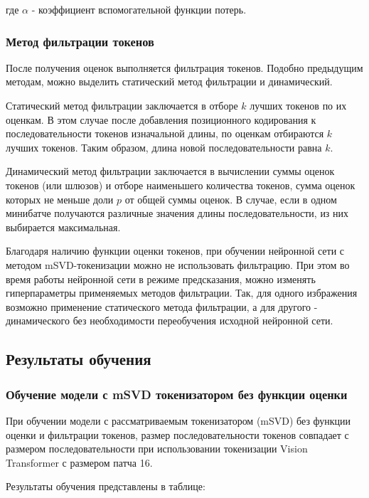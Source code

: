 \documentclass[times,specification,annotation]{itmo-student-thesis}
\begin{document}
где $\alpha$ - коэффициент вспомогательной функции потерь.

\subsubsection{Метод фильтрации токенов}
После получения оценок выполняется фильтрация токенов. Подобно предыдущим методам, можно выделить статический метод фильтрации и динамический.

Статический метод фильтрации заключается в отборе $k$ лучших токенов по их оценкам. В этом случае после добавления позиционного кодирования к последовательности токенов изначальной длины, по оценкам отбираются $k$ лучших токенов. Таким образом, длина новой последовательности равна $k$.

Динамический метод фильтрации заключается в вычислении суммы оценок токенов (или шлюзов) и отборе наименьшего количества токенов, сумма оценок которых не меньше доли $p$ от общей суммы оценок. В случае, если в одном минибатче получаются различные значения длины последовательности, из них выбирается максимальная.

Благодаря наличию функции оценки токенов, при обучении нейронной сети с методом mSVD-токенизации можно не использовать фильтрацию. При этом во время работы нейронной сети в режиме предсказания, можно изменять гиперпараметры применяемых методов фильтрации. Так, для одного избражения возможно применение статического метода фильтрации, а для другого - динамического без необходимости переобучения исходной нейронной сети.


\subsection{Результаты обучения}

\subsubsection{Обучение модели с mSVD токенизатором без функции оценки}

При обучении модели с рассматриваемым токенизатором (mSVD) без функции оценки и фильтрации токенов, размер последовательности токенов совпадает с размером последовательности при использовании токенизации Vision Transformer с размером патча 16. 

Результаты обучения представлены в таблице:
\end{document}
